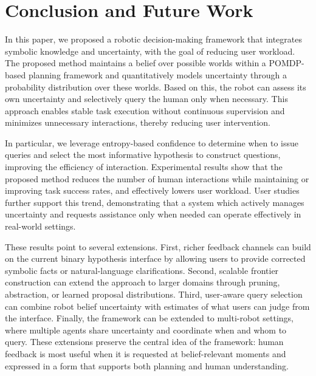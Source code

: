 \section{Conclusion and Future Work}
In this paper, we proposed a robotic decision-making framework that integrates symbolic knowledge and uncertainty, with the goal of reducing user workload. The proposed method maintains a belief over possible worlds within a POMDP-based planning framework and quantitatively models uncertainty through a probability distribution over these worlds. Based on this, the robot can assess its own uncertainty and selectively query the human only when necessary. This approach enables stable task execution without continuous supervision and minimizes unnecessary interactions, thereby reducing user intervention.

In particular, we leverage entropy-based confidence to determine when to issue queries and select the most informative hypothesis to construct questions, improving the efficiency of interaction. Experimental results show that the proposed method reduces the number of human interactions while maintaining or improving task success rates, and effectively lowers user workload. User studies further support this trend, demonstrating that a system which actively manages uncertainty and requests assistance only when needed can operate effectively in real-world settings.

These results point to several extensions. First, richer feedback channels can build on the current binary hypothesis interface by allowing users to provide corrected symbolic facts or natural-language clarifications. Second, scalable frontier construction can extend the approach to larger domains through pruning, abstraction, or learned proposal distributions. Third, user-aware query selection can combine robot belief uncertainty with estimates of what users can judge from the interface. Finally, the framework can be extended to multi-robot settings, where multiple agents share uncertainty and coordinate when and whom to query. These extensions preserve the central idea of the framework: human feedback is most useful when it is requested at belief-relevant moments and expressed in a form that supports both planning and human understanding.
